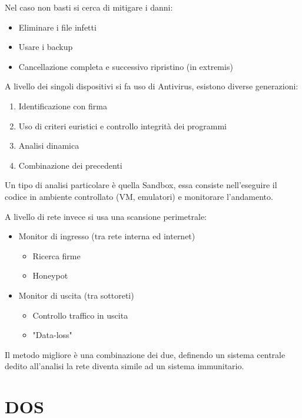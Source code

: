 \documentclass{article}
\begin{document}
\noindent Nel caso non basti si cerca di mitigare i danni:
\begin{itemize}
    \item Eliminare i file infetti
    \item Usare i backup
    \item Cancellazione completa e successivo ripristino (in extremis)\newline
\end{itemize}

\noindent A livello dei singoli dispositivi si fa uso di Antivirus, esistono diverse generazioni:
\begin{enumerate}
    \item Identificazione con firma
    \item Uso di criteri euristici e controllo integrità dei programmi
    \item Analisi dinamica
    \item Combinazione dei precedenti\newline
\end{enumerate}

\noindent Un tipo di analisi particolare è quella Sandbox, essa consiste nell'eseguire il codice in ambiente controllato (VM, emulatori) e monitorare l'andamento.\newline

\noindent A livello di rete invece si usa una scansione perimetrale:
\begin{itemize}
    \item Monitor di ingresso (tra rete interna ed internet)
        \begin{itemize}
            \item Ricerca firme
            \item Honeypot
        \end{itemize}
    \item Monitor di uscita (tra sottoreti)
    \begin{itemize}
        \item Controllo traffico in uscita
        \item "Data-loss"\newline
    \end{itemize}
\end{itemize}

\noindent Il metodo migliore è una combinazione dei due, definendo un sistema centrale dedito all'analisi la rete diventa simile ad un sistema immunitario. 

\section{DOS}
\end{document}
